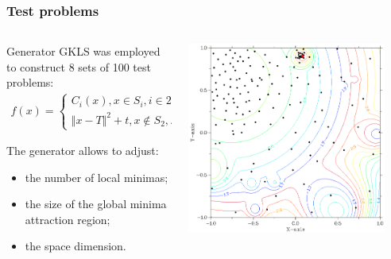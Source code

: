 \documentclass[aspectratio=1610]{beamer}
\begin{document}
\begin{frame}
  \frametitle{Test problems}
  \begin{columns}
    \begin{column}{0.5\textwidth}
      Generator GKLS was employed to construct 8 sets of 100 test problems:
      \begin{displaymath}
        \begin{matrix}
          f(x)=
          \left\{
          \begin{matrix}
          C_i(x), x \in S_i, i\in 2,\dots ,m \\
          \Vert x-T \Vert^2 + t, x\not\in S_2,\dots,S_m
          \end{matrix} \right.
        \end{matrix}
      \end{displaymath}

      The generator allows to adjust:
      \begin{itemize}
        \item the number of local minimas;
        \item the size of the global minima attraction region;
        \item the space dimension.
      \end{itemize}
    \end{column}
    \begin{column}{0.5\textwidth}
      \centerline{\includegraphics[width=0.9\textwidth]{gkls_color.png}}
    \end{column}
  \end{columns}
\end{frame}
\end{document}
